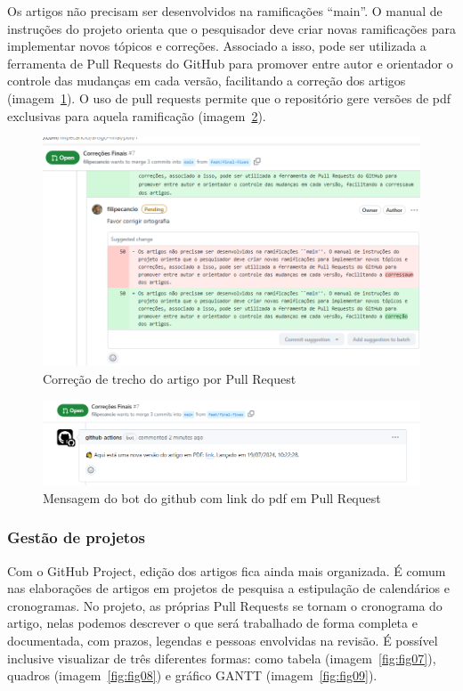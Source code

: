 Os artigos não precisam ser desenvolvidos na ramificações ``main''. O manual de instruções do projeto orienta que o pesquisador deve criar novas ramificações para implementar novos tópicos e correções. Associado a isso, pode ser utilizada a ferramenta de Pull Requests do GitHub para promover entre autor e orientador o controle das mudanças em cada versão, facilitando a correção dos artigos (imagem~\ref{fig:fig05}). O uso de pull requests permite que o repositório gere versões de pdf exclusivas para aquela ramificação (imagem~\ref{fig:fig06}).

\begin{figure}[ht]
	\centering
	\includegraphics[width=.6\textwidth]{./images/fig05.png}
	\caption{Correção de trecho do artigo por Pull Request}
	\label{fig:fig05}
\end{figure}

\begin{figure}[ht]
	\centering
	\includegraphics[width=.6\textwidth]{./images/fig06.png}
	\caption{Mensagem do bot do github com link do pdf em Pull Request}
	\label{fig:fig06}
\end{figure}


\subsubsection{Gestão de projetos}
Com o GitHub Project,  edição dos artigos fica ainda mais organizada. É comum nas elaborações de artigos em projetos de pesquisa a estipulação de calendários e cronogramas. No projeto, as próprias Pull Requests se tornam o cronograma do artigo, nelas podemos descrever o que será trabalhado de forma completa e documentada, com prazos, legendas e pessoas envolvidas na revisão. É possível inclusive visualizar de três diferentes formas: como tabela (imagem~\ref{fig:fig07}), quadros (imagem~\ref{fig:fig08}) e gráfico GANTT (imagem~\ref{fig:fig09}).

